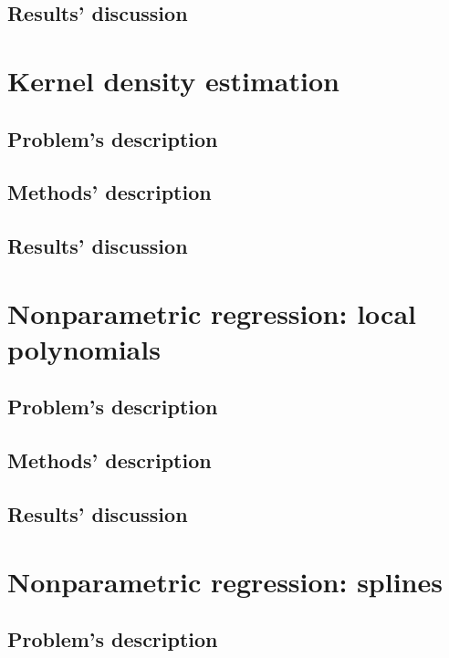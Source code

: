 \documentclass{report}
\begin{document}
\section{Results' discussion}


\chapter{Kernel density estimation}
\section{Problem's description}

\section{Methods' description}

\section{Results' discussion}


\chapter{Nonparametric regression: local polynomials}
\section{Problem's description}

\section{Methods' description}

\section{Results' discussion}


\chapter{Nonparametric regression: splines}
\section{Problem's description}
\end{document}
